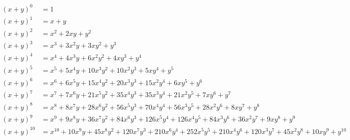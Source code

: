 \begin{align*}
    (x + y)^0 & = 1\\  (x + y)^1 & = x + y \\
    (x + y)^2 & = x^2 + 2xy + y^2 \\
    (x + y)^3 & = x^3 + 3x^2y + 3xy^2 + y^3 \\
    (x + y)^4 & = x^4 + 4x^3y + 6x^2y^2 + 4xy^3 + y^4 \\
    (x + y)^5 & = x^5 + 5x^4y + 10x^3y^2 + 10x^2y^3 + 5xy^4 + y^5 \\
    (x + y)^6 & = x^6 + 6x^5y + 15x^4y^2 + 20x^3y^3 + 15x^2y^4 + 6xy^5 + y^6 \\
    (x + y)^7 & = x^7 + 7x^6y + 21x^5y^2 + 35x^4y^3 + 35x^3y^4 + 21x^2y^5 + 7xy^6 + y^7 \\
    (x + y)^8 & = x^8 + 8x^7y + 28x^6y^2 + 56x^5y^3 + 70x^4y^4 + 56x^3y^5 + 28x^2y^6 + 8xy^7 + y^8 \\
    (x + y)^9 & = x^9 + 9x^8y + 36x^7y^2 + 84x^6y^3 + 126x^5y^4 + 126x^4y^5 + 84x^3y^6 + 36x^2y^7 + 9xy^8 + y^9 \\
    (x + y)^{10} & = x^{10} + 10x^9y + 45x^8y^2 + 120x^7y^3 + 210x^6y^4 + 252x^5y^5 + 210x^4y^6 + 120x^3y^7 + 45x^2y^8 + 10xy^9 + y^{10}
\end{align*}   
